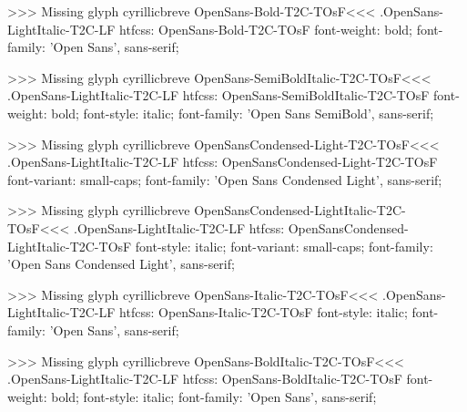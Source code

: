 >>>
Missing glyph	cyrillicbreve
\<OpenSans-Bold-T2C-TOsF\><<<
.OpenSans-LightItalic-T2C-LF
htfcss:  OpenSans-Bold-T2C-TOsF  font-weight: bold; font-family: 'Open Sans', sans-serif;

>>>
Missing glyph	cyrillicbreve
\<OpenSans-SemiBoldItalic-T2C-TOsF\><<<
.OpenSans-LightItalic-T2C-LF
htfcss:  OpenSans-SemiBoldItalic-T2C-TOsF  font-weight: bold; font-style: italic; font-family: 'Open Sans SemiBold', sans-serif;

>>>
Missing glyph	cyrillicbreve
\<OpenSansCondensed-Light-T2C-TOsF\><<<
.OpenSans-LightItalic-T2C-LF
htfcss:  OpenSansCondensed-Light-T2C-TOsF  font-variant: small-caps; font-family: 'Open Sans Condensed Light', sans-serif;

>>>
Missing glyph	cyrillicbreve
\<OpenSansCondensed-LightItalic-T2C-TOsF\><<<
.OpenSans-LightItalic-T2C-LF
htfcss:  OpenSansCondensed-LightItalic-T2C-TOsF  font-style: italic; font-variant: small-caps; font-family: 'Open Sans Condensed Light', sans-serif;

>>>
Missing glyph	cyrillicbreve
\<OpenSans-Italic-T2C-TOsF\><<<
.OpenSans-LightItalic-T2C-LF
htfcss:  OpenSans-Italic-T2C-TOsF  font-style: italic; font-family: 'Open Sans', sans-serif;

>>>
Missing glyph	cyrillicbreve
\<OpenSans-BoldItalic-T2C-TOsF\><<<
.OpenSans-LightItalic-T2C-LF
htfcss:  OpenSans-BoldItalic-T2C-TOsF  font-weight: bold; font-style: italic; font-family: 'Open Sans', sans-serif;

